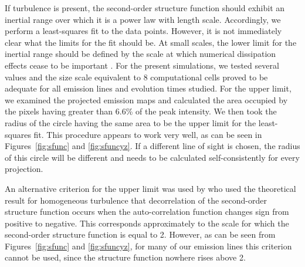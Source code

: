 \documentclass[useAMS,usenatbib]{mn2e}
\begin{document}
If turbulence is present, the second-order structure function should exhibit an
inertial range over which it is a power law with
length scale. Accordingly, we perform a least-squares fit to the data
points. However, it is not immediately clear what the limits for the
fit should be. At small scales, the lower limit for the inertial range
should be defined by the scale at which numerical dissipation effects
cease to be important \citep {2004ApJ...604..196B}. For the present
simulations, we tested several values and the size scale equivalent to
8 computational cells proved to be adequate for all emission lines and
evolution times studied. For the upper limit, we examined the
projected emission maps and calculated the area occupied by the pixels
having greater than 6.6\% of the peak intensity. We then took the
radius of the circle having the same area to be the upper limit for the
least-squares fit. This procedure appears to work very well, as can be
seen in Figures~\ref{fig:sfunc} and \ref{fig:sfuncyz}. If a different
line of sight is chosen, the radius of this circle will be different and needs to be
calculated self-consistently for every projection.

An alternative criterion for the upper limit was used by \citet
{2011MNRAS.413..721L} who used the theoretical result for homogeneous
turbulence that decorrelation of the second-order structure function
occurs when the auto-correlation function changes sign from positive to
negative. This corresponds approximately to the scale for which the
second-order structure function is equal to 2. However, as can be seen
from Figures~\ref{fig:sfunc} and \ref{fig:sfuncyz}, 
for many of our emission lines this criterion cannot be used,
since the structure function nowhere rises above 2.
\end{document}
